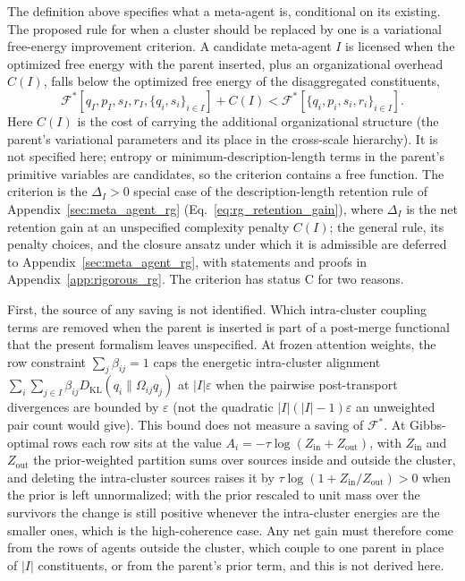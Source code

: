 \documentclass[11pt]{article}
\begin{document}
The definition above specifies what a meta-agent is, conditional on its existing. The proposed rule for when a cluster should be replaced by one is a variational free-energy improvement criterion. A candidate meta-agent $I$ is licensed when the optimized free energy with the parent inserted, plus an organizational overhead $C(I)$, falls below the optimized free energy of the disaggregated constituents,
\begin{equation}
\mathcal{F}^*[q_I, p_I, s_I, r_I, \{q_i, s_i\}_{i \in I}] + C(I) < \mathcal{F}^*[\{q_i, p_i, s_i, r_i\}_{i \in I}].
\label{eq:meta_agent_FE_criterion}
\end{equation}
Here $C(I)$ is the cost of carrying the additional organizational structure (the parent's variational parameters and its place in the cross-scale hierarchy). It is not specified here; entropy or minimum-description-length terms in the parent's primitive variables are candidates, so the criterion contains a free function. The criterion is the $\Delta_I > 0$ special case of the description-length retention rule of Appendix~\ref{sec:meta_agent_rg} (Eq.~\eqref{eq:rg_retention_gain}), where $\Delta_I$ is the net retention gain at an unspecified complexity penalty $C(I)$; the general rule, its penalty choices, and the closure ansatz under which it is admissible are deferred to Appendix~\ref{sec:meta_agent_rg}, with statements and proofs in Appendix~\ref{app:rigorous_rg}. The criterion has status C for two reasons.

First, the source of any saving is not identified. Which intra-cluster coupling terms are removed when the parent is inserted is part of a post-merge functional that the present formalism leaves unspecified. At frozen attention weights, the row constraint $\sum_j \beta_{ij} = 1$ caps the energetic intra-cluster alignment $\sum_i \sum_{j \in I} \beta_{ij} D_{\mathrm{KL}}(q_i \| \Omega_{ij} q_j)$ at $|I|\varepsilon$ when the pairwise post-transport divergences are bounded by $\varepsilon$ (not the quadratic $|I|(|I|-1)\varepsilon$ an unweighted pair count would give). This bound does not measure a saving of $\mathcal{F}^*$. At Gibbs-optimal rows each row sits at the value $A_i = -\tau\log(Z_{\mathrm{in}} + Z_{\mathrm{out}})$, with $Z_{\mathrm{in}}$ and $Z_{\mathrm{out}}$ the prior-weighted partition sums over sources inside and outside the cluster, and deleting the intra-cluster sources raises it by $\tau\log(1 + Z_{\mathrm{in}}/Z_{\mathrm{out}}) > 0$ when the prior is left unnormalized; with the prior rescaled to unit mass over the survivors the change is still positive whenever the intra-cluster energies are the smaller ones, which is the high-coherence case. Any net gain must therefore come from the rows of agents outside the cluster, which couple to one parent in place of $|I|$ constituents, or from the parent's prior term, and this is not derived here.
\end{document}
